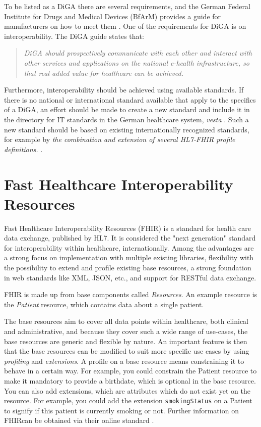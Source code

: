 \documentclass[12px]{report}
\def\code#1{\texttt{#1}} %
\newcommand{\fhir}{FHIR\textsuperscript{\textregistered}}
\newcommand{\hl}{HL7\textsuperscript{\textregistered}}
\begin{document}
To be listed as a DiGA there are several requirements, and the German Federal Institute for Drugs and Medical Devices (BfArM) provides a guide for manufacturers on how to meet them \cite{guide}.
One of the requirements for DiGA is on interoperability. The DiGA guide \cite[p.51]{guide} states that:

\begin{quotation}
    \noindent \textit{DiGA should prospectively communicate with each other and interact with other services and applications on the national e-health infrastructure, so that real added value for healthcare can be achieved.}
\end{quotation}

Furthermore, interoperability should be achieved using available standards. If there is no national or international standard available that apply to the specifics of a DiGA, an effort should be made to create a new standard and include it in the directory for IT standards in the German healthcare system, \textit{vesta} \cite{vesta}.
Such a new standard should be based on existing internationally recognized standards, for example by \textit{the combination and extension of several HL7-FHIR profile definitions.} \cite[p.53-54]{guide}.

\section{Fast Healthcare Interoperability Resources}
Fast Healthcare Interoperability Resources (\fhir) \cite{FHIR} is a standard for health care data exchange, published by \hl. It is considered the "next generation" standard for interoperability within healthcare, internationally.
Among the advantages are a strong focus on implementation with multiple existing libraries, flexibility with the possibility to extend and profile existing base resources, a strong foundation in web standards like XML, JSON, etc., and support for RESTful data exchange.

FHIR is made up from base components called \textit{Resources}. An example resource is the \textit{Patient} resource, which contains data about a single patient. 

The base resources aim to cover all data points within healthcare, both clinical and administrative, and because they cover such a wide range of use-cases, the base resources are generic and flexible by nature.
An important feature is then that the base resources can be modified to suit more specific use cases by using \textit{profiling} and \textit{extensions}. A profile on a base resource means constraining it to behave in a certain way.
For example, you could constrain the Patient resource to make it mandatory to provide a birthdate, which is optional in the base resource. You can also add extensions, which are attributes which do not exist yet on the resource. For example, you could
add the extension \code{smokingStatus} on a Patient to signify if this patient is currently smoking or not. Further information on \fhir can be obtained via their online standard \cite{FHIR}.
\end{document}
